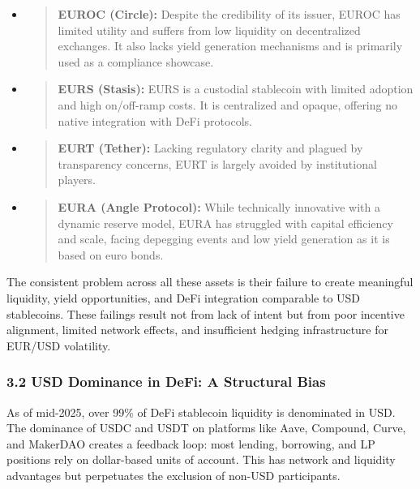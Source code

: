 \begin{itemize}
\item
  \begin{quote}
  \textbf{EUROC (Circle):} Despite the credibility of its issuer, EUROC
  has limited utility and suffers from low liquidity on decentralized
  exchanges. It also lacks yield generation mechanisms and is primarily
  used as a compliance showcase.
  \end{quote}
\item
  \begin{quote}
  \textbf{EURS (Stasis):} EURS is a custodial stablecoin with limited
  adoption and high on/off-ramp costs. It is centralized and opaque,
  offering no native integration with DeFi protocols.
  \end{quote}
\item
  \begin{quote}
  \textbf{EURT (Tether):} Lacking regulatory clarity and plagued by
  transparency concerns, EURT is largely avoided by institutional
  players.
  \end{quote}
\item
  \begin{quote}
  \textbf{EURA (Angle Protocol):} While technically innovative with a
  dynamic reserve model, EURA has struggled with capital efficiency and
  scale, facing depegging events and low yield generation as it is based
  on euro bonds.
  \end{quote}
\end{itemize}

The consistent problem across all these assets is their failure to
create meaningful liquidity, yield opportunities, and DeFi integration
comparable to USD stablecoins. These failings result not from lack of
intent but from poor incentive alignment, limited network effects, and
insufficient hedging infrastructure for EUR/USD volatility.

\hypertarget{usd-dominance-in-defi-a-structural-bias}{%
\subsubsection{3.2 USD Dominance in DeFi: A Structural
Bias}\label{usd-dominance-in-defi-a-structural-bias}}

As of mid-2025, over 99\% of DeFi stablecoin liquidity is denominated in
USD. The dominance of USDC and USDT on platforms like Aave, Compound,
Curve, and MakerDAO creates a feedback loop: most lending, borrowing,
and LP positions rely on dollar-based units of account. This has network
and liquidity advantages but perpetuates the exclusion of non-USD
participants.

